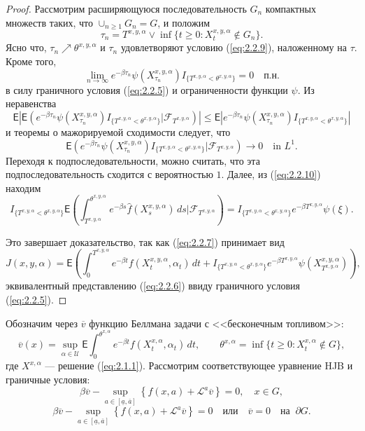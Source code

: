 \begin{proof}
Рассмотрим расширяющуюся последовательность $G_n$ компактных множеств таких, что $\cup_{n\ge 1} G_n=G$, и положим
$$\tau_n=T^{x,y,\alpha}\vee \inf\{t\ge 0:X_t^{x,y,\alpha}\not \in G_n\}.$$
Ясно что, $\tau_n\nearrow\theta^{x,y,\alpha}$ и  $\tau_n$ удовлетворяют условию (\ref{eq:2.2.9}), наложенному на $\tau$. Кроме того,
$$ \lim_{n\to\infty} e^{-\beta\tau_n}\psi(X^{x,y,\alpha}_{\tau_n}) I_{\{T^{x,y,\alpha}<\theta^{x,y,\alpha}\}}=0\quad \textrm{п.н.}$$
в силу граничного условия (\ref{eq:2.2.5}) и ограниченности функции $\psi$. Из неравенства
$$\mathsf E\left|\mathsf E\left(e^{-\beta\tau_n}\psi(X^{x,y,\alpha}_{\tau_n}) I_{\{T^{x,y,\alpha}<\theta^{x,y,\alpha}\}}\Bigr|\mathscr F_{T^{x,y,\alpha}}\right) \right|\le \mathsf E\left| e^{-\beta\tau_n}\psi(X^{x,y,\alpha}_{\tau_n}) I_{\{T^{x,y,\alpha}<\theta^{x,y,\alpha}\}}\right|$$
и теоремы о мажорируемой сходимости следует, что
$$ \mathsf E\left(e^{-\beta\tau_n}\psi(X^{x,y,\alpha}_{\tau_n}) I_{\{T^{x,y,\alpha}<\theta^{x,y,\alpha}\}}\Bigr|\mathscr F_{T^{x,y,\alpha}}\right)\to 0\quad \textrm{in } L^1.$$
Переходя к подпоследовательности, можно считать, что эта подпоследовательность сходится с вероятностью $1$. Далее, из (\ref{eq:2.2.10}) находим
$$ I_{\{T^{x,y,\alpha}<\theta^{x,y,\alpha}\}}\mathsf E\left(\int_{T^{x,y,\alpha}}^{\theta^{x,y,\alpha}} e^{-\beta s}\widehat f(X_s^{x,y,\alpha})\,ds\biggr|\mathscr F_{T^{x,y,\alpha}}\right)=I_{\{T^{x,y,\alpha}<\theta^{x,y,\alpha}\}} e^{-\beta T^{x,y,\alpha}}\psi(\xi).$$

Это завершает доказательство, так как (\ref{eq:2.2.7}) принимает вид
$$ J(x,y,\alpha)=\mathsf E\left(\int_0^{T^{x,y,\alpha}} e^{-\beta t} f(X_t^{x,y,\alpha},\alpha_t)\,dt+I_{\{T^{x,y,\alpha}<\theta^{x,y,\alpha}\}} e^{-\beta T^{x,y,\alpha}}\psi(X_{T^{x,y,\alpha}}^{x,y,\alpha})\right),$$
эквивалентный представлению (\ref{eq:2.2.6}) ввиду граничного условия (\ref{eq:2.2.5}).
\end{proof}

Обозначим через $\overline v$ функцию Беллмана задачи с <<бесконечным топливом>>:
\begin{equation} \label{eq:2.2.11}
\overline v(x)=\sup_{\alpha\in\mathcal U} \mathsf E\int_0^{\theta^{x,\alpha}} e^{-\beta t} f(X_t^{x,\alpha},\alpha_t)\,dt,
\qquad \theta^{x,\alpha}=\inf\{t\ge 0: X_t^{x,\alpha}\not \in G\},
\end{equation}
где $X^{x,\alpha}$ --- решение (\ref{eq:2.1.1}). Рассмотрим соответствующее уравнение HJB и граничные условия:
\begin{equation} \label{eq:2.2.12}
\beta \overline v- \sup_{a \in [\underline a, \overline a]} \left\{f(x,a)+ \mathcal L^a \overline v \right\}=0,\quad x\in G,
\end{equation}
\begin{equation} \label{eq:2.2.13}
\beta \overline v- \sup_{a \in [\underline a, \overline a]} \left\{f(x,a)+ \mathcal L^a \overline v \right\}=0 \quad
\textrm{или}\quad \overline v=0\quad \textrm{на }\ \partial G.
\end{equation}

